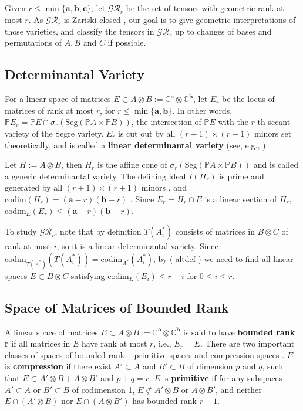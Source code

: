 \documentclass[10pt]{article} %
\newcommand{\aaa}{\mathbf{a}}
\newcommand{\bbb}{\mathbf{b}}
\newcommand{\ccc}{\mathbf{c}}
\newcommand{\BC}{\mathbb{C}}
\newcommand{\ot}{\otimes}
\theoremstyle{definition}
\begin{document}
Given $r\leq \min\{\aaa,\bbb,\ccc\}$, let $\mathcal{GR}_r$ be the set of tensors with geometric rank at most $r$. As $\mathcal{GR}_r$ is Zariski closed \cite{KMZ20}, our goal is to give geometric interpretations of those varieties, and classify the tensors in $\mathcal{GR}_r$ up to changes of bases and permutations of $A,B$ and $C$ if possible.

\subsection{Determinantal Variety}
For a linear space of matrices $E\subset A\ot B:=\BC^{\aaa}\ot \BC^{\bbb}$, let $E_r$ be the locus of matrices of rank at most $r$, for $r\leq \min\{\aaa,\bbb\}$. In other words, $\mathbb{P}E_r=\mathbb{P}E\cap\sigma_r(\mathrm{Seg}(\mathbb{P}A\times\mathbb{P}B))$, the intersection of $\mathbb{P}E$ with the $r$-th secant variety of the Segre variety. $E_r$ is cut out by all $(r+1)\times(r+1)$ minors set theoretically, and is called a \textbf{linear determinantal variety} (see, e.g., \cite[Ch. II]{arbarello1985geometry}).

Let $H:=A\ot B$, then $H_r$ is the affine cone of $\sigma_r(\mathrm{Seg}(\mathbb{P}A\times\mathbb{P}B))$ and is called a generic determinantal variety. The defining ideal $I(H_r)$ is prime and generated by all $(r+1)\times(r+1)$ minors \cite{weyl1946classical}, and $\mathrm{codim}(H_r)=(\aaa-r)(\bbb-r)$ \cite{hochster1971cohen}. Since $E_r=H_r\cap E$ is a linear section of $H_r$, $\mathrm{codim}_E (E_r)\leq (\aaa-r)(\bbb-r)$.

To study $\mathcal{GR}_r$, note that by definition $T(A^*_i)$ consists of matrices in $B\ot C$ of rank at most $i$, so it is a linear determinantal variety. Since $\mathrm{codim}_{T(A^*)}(T(A^*_i))=\mathrm{codim}_{A^*}(A^*_i)$, by (\ref{altdef}) we need to find all linear spaces $E\subset B\ot C$ satisfying $\mathrm{codim}_E (E_i)\leq r-i$ for $0\leq i\leq r$.

\subsection{Space of Matrices of Bounded Rank}
A linear space of matrices $E\subset A\ot B:=\BC^{\aaa}\ot \BC^{\bbb}$ is said to have \textbf{bounded rank r} if all matrices in $E$ have rank at most $r$, i.e., $E_r=E$. There are two important classes of spaces of bounded rank -- primitive spaces \cite{Atk81} and compression spaces \cite{EH88}. $E$ is \textbf{compression} if there exist $A'\subset A$ and $B'\subset B$ of dimension $p$ and $q$, such that $E\subset A'\ot B+A\ot B'$ and $p+q=r$. $E$ is \textbf{primitive} if for any subspaces $A'\subset A$ or $B'\subset B$ of codimension 1, $E\not\subset A'\ot B$ or $A\ot B'$, and neither $E\cap(A'\ot B)$ nor $E\cap(A\ot B')$ has bounded rank $r-1$.
\end{document}
